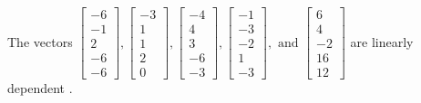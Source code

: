 \begin{exercise}
\begin{exerciseStatement}
  \end{exerciseStatement}
  \begin{exerciseAnswer}
   The vectors \(\left[\begin{array}{r}
-6 \\
-1 \\
2 \\
-6 \\
-6
\end{array}\right] , \left[\begin{array}{r}
-3 \\
1 \\
1 \\
2 \\
0
\end{array}\right] , \left[\begin{array}{r}
-4 \\
4 \\
3 \\
-6 \\
-3
\end{array}\right] , \left[\begin{array}{r}
-1 \\
-3 \\
-2 \\
1 \\
-3
\end{array}\right] , \text{ and } \left[\begin{array}{r}
6 \\
4 \\
-2 \\
16 \\
12
\end{array}\right]\) are 
  	 linearly dependent  .
  


  \end{exerciseAnswer}
\end{exercise}